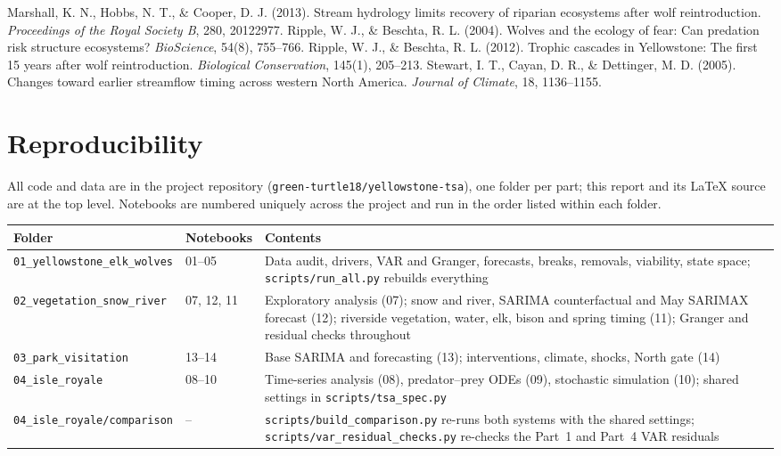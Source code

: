 \documentclass[11pt,a4paper]{article}
\begin{document}
\begin{thebibliography}{99}
 Marshall, K. N., Hobbs, N. T., \& Cooper, D. J. (2013). Stream hydrology limits recovery of riparian ecosystems after wolf reintroduction. \emph{Proceedings of the Royal Society B}, 280, 20122977.
 Ripple, W. J., \& Beschta, R. L. (2004). Wolves and the ecology of fear: Can predation risk structure ecosystems? \emph{BioScience}, 54(8), 755--766.
 Ripple, W. J., \& Beschta, R. L. (2012). Trophic cascades in Yellowstone: The first 15 years after wolf reintroduction. \emph{Biological Conservation}, 145(1), 205--213.
 Stewart, I. T., Cayan, D. R., \& Dettinger, M. D. (2005). Changes toward earlier streamflow timing across western North America. \emph{Journal of Climate}, 18, 1136--1155.
\end{thebibliography}

\appendix
\section{Reproducibility}
All code and data are in the project repository (\texttt{green-turtle18/yellowstone-tsa}), one folder per part; this report and its LaTeX source are at the top level. Notebooks are numbered uniquely across the project and run in the order listed within each folder.
\begin{table}[H]
\centering\small
\begin{tabularx}{\textwidth}{@{}l l Y@{}}
\toprule
Folder & Notebooks & Contents \\
\midrule
\texttt{01\_yellowstone\_elk\_wolves} & 01--05 & Data audit, drivers, VAR and Granger, forecasts, breaks, removals, viability, state space; \texttt{scripts/run\_all.py} rebuilds everything \\
\texttt{02\_vegetation\_snow\_river} & 07, 12, 11 & Exploratory analysis (07); snow and river, SARIMA counterfactual and May SARIMAX forecast (12); riverside vegetation, water, elk, bison and spring timing (11); Granger and residual checks throughout \\
\texttt{03\_park\_visitation} & 13--14 & Base SARIMA and forecasting (13); interventions, climate, shocks, North gate (14) \\
\texttt{04\_isle\_royale} & 08--10 & Time-series analysis (08), predator--prey ODEs (09), stochastic simulation (10); shared settings in \texttt{scripts/tsa\_spec.py} \\
\texttt{04\_isle\_royale/comparison} & -- & \texttt{scripts/build\_comparison.py} re-runs both systems with the shared settings; \texttt{scripts/var\_residual\_checks.py} re-checks the Part~1 and Part~4 VAR residuals \\
\bottomrule
\end{tabularx}
\end{table}
\end{document}
